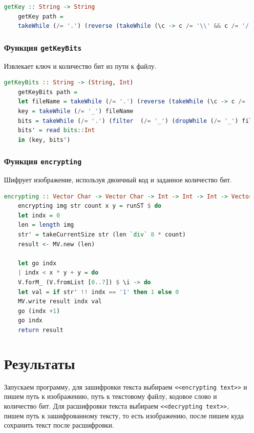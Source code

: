 \documentclass[10pt,a4paper,final]{article} %
\begin{document}
\begin{lstlisting}[language=Haskell, caption=Функция получения ключа]
	getKey :: String -> String
	getKey path = 
	takeWhile (/= '.') (reverse (takeWhile (\c -> c /= '\\' && c /= '/') (reverse path)))
\end{lstlisting}

\subsubsection{Функция \texttt{getKeyBits}}

Извлекает ключ и количество бит из пути к файлу.

\begin{lstlisting}[language=Haskell, caption=Функция получения ключа и битов]
	getKeyBits :: String -> (String, Int)
	getKeyBits path = 
	let fileName = takeWhile (/= '.') (reverse (takeWhile (\c -> c /= '\\' && c /= '/') (reverse path)))
	key = takeWhile (/= '_') fileName
	bits = takeWhile (/= '.') (filter  (/= '_') (dropWhile (/= '_') fileName))
	bits' = read bits::Int
	in (key, bits')
\end{lstlisting}

\subsubsection{Функция \texttt{encrypting}}

Шифрует изображение, используя двоичный код и заданное количество бит.

\begin{lstlisting}[language=Haskell, caption=Функция шифрования изображения]
	encrypting :: Vector Char -> Vector Char -> Int -> Int -> Int -> Vector Char
	encrypting img str count x y = runST $ do
	let indx = 0
	len = length img
	str' = takeCurrentSize str (len `div` 8 * count)
	result <- MV.new (len)
	
	let go indx
	| indx < x * y + y = do
	V.forM_ (V.fromList [0..7]) $ \i -> do
	let val = if str' !! indx == '1' then 1 else 0
	MV.write result indx val
	go (indx +1)
	go indx
	return result
\end{lstlisting}


\newpage
\section{Результаты}

Запускаем программу, для зашифровки текста выбираем \texttt{<<encrypting text>>} и пишем путь к изображению, путь к текстовому файлу, кодовое слово и количество бит.
Для расшифровки текста выбираем \texttt{<<decrypting text>>}, пишем путь к зашифрованному тексту, то есть изображению, после пишем куда сохранить текст после расшифровки.
\end{document}
